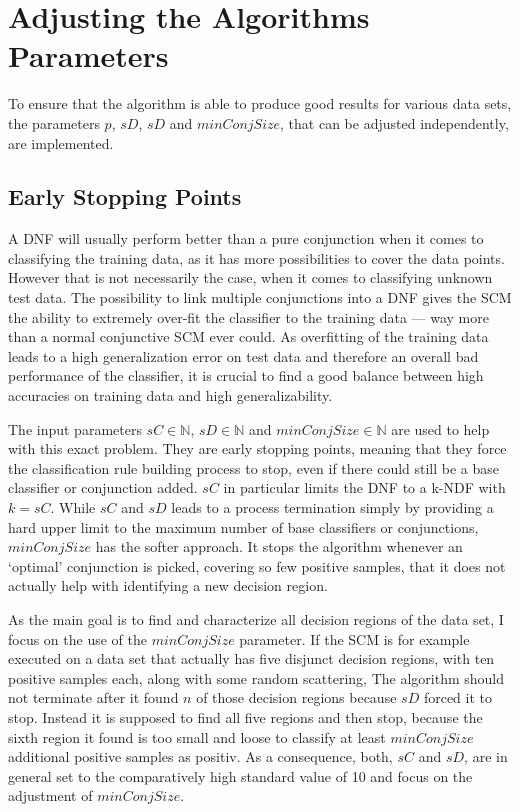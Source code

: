 \section{Adjusting the Algorithms Parameters}\label{sec:adjustingParam}

To ensure that the algorithm is able to produce good results for various data sets,
the parameters \(p\), \(sD\), \(sD\) and \(minConjSize\), that can be adjusted independently, are implemented.

\subsection{Early Stopping Points}

A DNF will usually perform better than a pure conjunction when it comes to classifying the training data, as it has more possibilities to cover the data points.
However that is not necessarily the case, when it comes to classifying unknown test data.
The possibility to link multiple conjunctions into a DNF gives the SCM the ability to extremely
over-fit the classifier to the training data --- way more than a normal conjunctive SCM ever could.
As overfitting of the training data leads to a high generalization error on test data and therefore
an overall bad performance of the classifier, it is crucial to find a good balance between high accuracies on
training data and high generalizability.

The input parameters \(sC\in \mathbb{N}\), \(sD\in \mathbb{N}\) and \(minConjSize\in \mathbb{N}\) are used to help with this exact problem.
They are early stopping points, meaning that they force the classification rule building process to stop,
even if there could still be a base classifier or conjunction added.
\(sC\) in particular limits the DNF to a k-NDF with \(k = sC\).
While \(sC\) and \(sD\) leads to a process termination simply by providing a hard upper limit to the maximum number of
base classifiers or conjunctions, \(minConjSize\) has the softer approach.
It stops the algorithm whenever an `optimal' conjunction is picked, covering so few positive samples, 
that it does not actually help with identifying a new decision region.

As the main goal is to find and characterize all decision regions of the data set, I focus on the use of the \(minConjSize\) parameter.
If the SCM is for example executed on a data set that actually has five disjunct decision regions, with ten positive samples each, along with some random scattering,
The algorithm should not terminate after it found \(n\) of those decision regions because \(sD\) forced it to stop.
Instead it is supposed to find all five regions and then stop, because the sixth region it found
is too small and loose to classify at least \(minConjSize\) additional positive samples as positiv.
As a consequence, both, \(sC\) and \(sD\), are in general set to the comparatively high standard value of 10 and
focus on the adjustment of \(minConjSize\).


